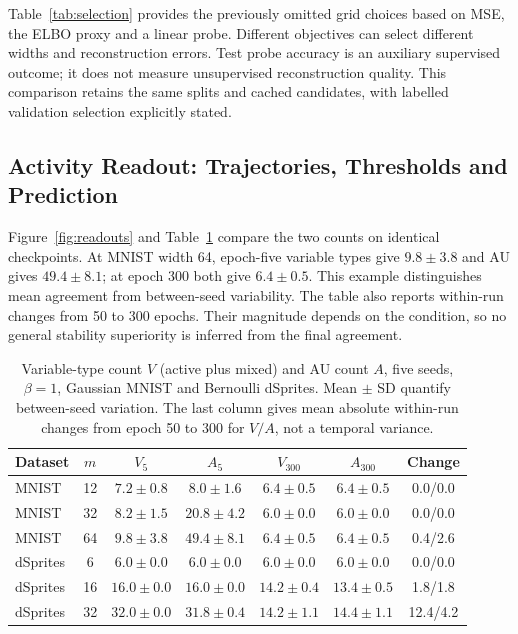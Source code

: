\documentclass[make,article,submit,pdftex,moreauthors]{Definitions/mdpi}
\begin{document}
Table~\ref{tab:selection} provides the previously omitted grid choices
based on MSE, the ELBO proxy and a linear probe. Different objectives can
select different widths and reconstruction errors. Test probe accuracy
is an auxiliary supervised outcome; it does not measure unsupervised
reconstruction quality. This comparison retains the same splits and
cached candidates, with labelled validation selection explicitly stated.

\subsection{Activity Readout: Trajectories, Thresholds and Prediction}\label{sec:au}
Figure~\ref{fig:readouts} and Table~\ref{tab:readouts} compare the two
counts on identical checkpoints. At MNIST width 64, epoch-five variable
types give $9.8\pm3.8$ and AU gives $49.4\pm8.1$; at epoch 300 both
give $6.4\pm0.5$. This example distinguishes mean agreement from
between-seed variability. The table also reports within-run changes from
50 to 300 epochs. Their magnitude depends on the condition, so no
general stability superiority is inferred from the final agreement.

\begin{table}[H]
\caption{Variable-type count $V$ (active plus mixed) and AU count $A$, five seeds, $\beta=1$, Gaussian MNIST and Bernoulli dSprites. Mean $\pm$ SD quantify between-seed variation. The last column gives mean absolute within-run changes from epoch 50 to 300 for $V/A$, not a temporal variance.}\label{tab:readouts}
\footnotesize
\setlength{\tabcolsep}{3.5pt}
\begin{tabular*}{\textwidth}{@{\extracolsep{\fill}}lcccccc@{}}
\toprule
Dataset & $m$ & $V_5$ & $A_5$ & $V_{300}$ & $A_{300}$ & Change \\
\midrule
MNIST & 12 & $7.2 \pm 0.8$ & $8.0 \pm 1.6$ & $6.4 \pm 0.5$ & $6.4 \pm 0.5$ & 0.0/0.0 \\
MNIST & 32 & $8.2 \pm 1.5$ & $20.8 \pm 4.2$ & $6.0 \pm 0.0$ & $6.0 \pm 0.0$ & 0.0/0.0 \\
MNIST & 64 & $9.8 \pm 3.8$ & $49.4 \pm 8.1$ & $6.4 \pm 0.5$ & $6.4 \pm 0.5$ & 0.4/2.6 \\
dSprites & 6 & $6.0 \pm 0.0$ & $6.0 \pm 0.0$ & $6.0 \pm 0.0$ & $6.0 \pm 0.0$ & 0.0/0.0 \\
dSprites & 16 & $16.0 \pm 0.0$ & $16.0 \pm 0.0$ & $14.2 \pm 0.4$ & $13.4 \pm 0.5$ & 1.8/1.8 \\
dSprites & 32 & $32.0 \pm 0.0$ & $31.8 \pm 0.4$ & $14.2 \pm 1.1$ & $14.4 \pm 1.1$ & 12.4/4.2 \\
\bottomrule
\end{tabular*}
\end{table}
\end{document}
